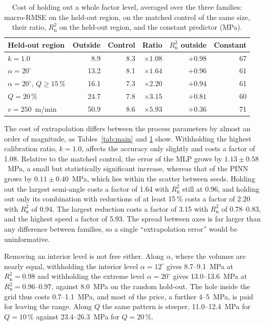 \documentclass[pdflatex,sn-basic,Numbered]{sn-jnl}
\begin{document}
\begin{table}[t]
\caption[Cost of holding out a whole factor level]{Cost of holding out a whole factor level, averaged over the three families: macro-RMSE on the held-out region, on the matched control of the same size, their ratio, $R^2_{\mathrm{n}}$ on the held-out region, and the constant predictor (MPa).}
\label{tab:axis}
\centering
\begin{tabular}{@{}lrrrrr@{}}
\toprule
Held-out region & Outside & Control & Ratio & $R^2_{\mathrm{n}}$ outside & Constant \\
\midrule
$k=1.0$                              & 8.9  & 8.3 & $\times1.08$ & $+0.98$ & 67 \\
$\alpha=20^\circ$                    & 13.2 & 8.1 & $\times1.64$ & $+0.96$ & 61 \\
$\alpha=20^\circ$, $Q\ge15\,\%$        & 16.1 & 7.3 & $\times2.20$ & $+0.94$ & 61 \\
$Q=20\,\%$                             & 24.7 & 7.8 & $\times3.15$ & $+0.81$ & 60 \\
$v=250$~m/min                        & 50.9 & 8.6 & $\times5.93$ & $+0.36$ & 71 \\
\bottomrule
\end{tabular}
\end{table}

The cost of extrapolation differs between the process parameters by almost an order of magnitude, as Tables~\ref{tab:main} and \ref{tab:axis} show. Withholding the highest calibration ratio, $k=1.0$, affects the accuracy only slightly and costs a factor of 1.08. Relative to the matched control, the error of the MLP grows by $1.13\pm0.58$~MPa, a small but statistically significant increase, whereas that of the PINN grows by $0.11\pm0.40$~MPa, which lies within the scatter between seeds.
Holding out the largest semi-angle costs a factor of 1.64 with $R^2_{\mathrm{n}}$ still at 0.96, and holding out only its combination with reductions of at least 15\,\% costs a factor of 2.20 with $R^2_{\mathrm{n}}$ of 0.94. The largest reduction costs a factor of 3.15 with $R^2_{\mathrm{n}}$ of 0.78--0.83, and the highest speed a factor of 5.93. The spread between axes is far larger than any difference between families, so a single ``extrapolation error'' would be uninformative.

Removing an interior level is not free either. Along $\alpha$, where the volumes are nearly equal, withholding the interior level $\alpha=12^\circ$ gives 8.7--9.1~MPa at $R^2_{\mathrm{n}}=0.98$ and withholding the extreme level $\alpha=20^\circ$ gives 13.0--13.6~MPa at $R^2_{\mathrm{n}}=0.96$--$0.97$, against 8.0~MPa on the random hold-out. The hole inside the grid thus costs 0.7--1.1~MPa, and most of the price, a further 4--5~MPa, is paid for leaving the range.
Along $Q$ the same pattern is steeper, 11.0--12.4~MPa for $Q=10\,\%$ against 23.4--26.3~MPa for $Q=20\,\%$.
\end{document}
